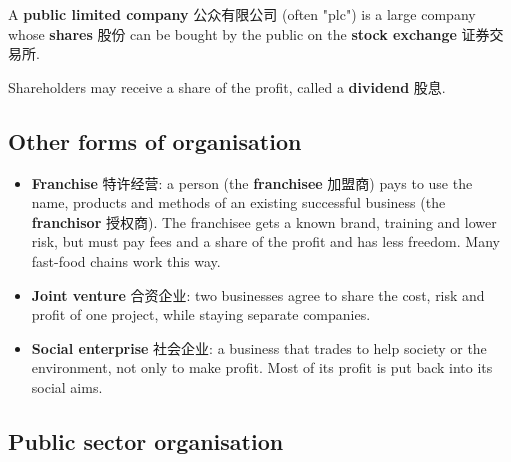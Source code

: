\documentclass[11pt]{article}
\begin{document}
A \textbf{public limited company} 公众有限公司 (often "plc") is a large company whose \textbf{shares} 股份 can be bought by the public on the \textbf{stock exchange} 证券交易所.

\begin{center}
\end{center}

Shareholders may receive a share of the profit, called a \textbf{dividend} 股息.

\subsection*{Other forms of organisation}

\begin{itemize}
\item \textbf{Franchise} 特许经营: a person (the \textbf{franchisee} 加盟商) pays to use the name, products and methods of an existing successful business (the \textbf{franchisor} 授权商). The franchisee gets a known brand, training and lower risk, but must pay fees and a share of the profit and has less freedom. Many fast-food chains work this way.

\item \textbf{Joint venture} 合资企业: two businesses agree to share the cost, risk and profit of one project, while staying separate companies.

\item \textbf{Social enterprise} 社会企业: a business that trades to help society or the environment, not only to make profit. Most of its profit is put back into its social aims.

\end{itemize}

\subsection*{Public sector organisation}
\end{document}
